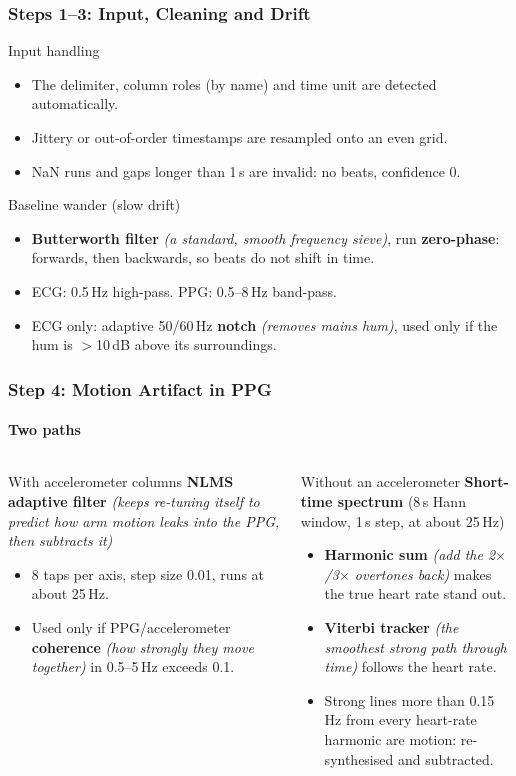 \documentclass[t,aspectratio=169]{beamer}
\newcommand*\lev{\item[\color{red}\scalebox{0.9}{\textbullet}]}
\newcommand{\plain}[1]{{\color{gray}\textit{(#1)}}}
\begin{document}
\begin{frame}
\frametitle{Steps 1--3: Input, Cleaning and Drift}
\begin{block}{Input handling}
\begin{itemize}
  \item The delimiter, column roles (by name) and time unit are detected automatically.
  \item Jittery or out-of-order timestamps are resampled onto an even grid.
  \item NaN runs and gaps longer than 1\,s are invalid: no beats, confidence 0.
\end{itemize}
\end{block}
\begin{block}{Baseline wander (slow drift)}
\begin{itemize}
  \item \textbf{Butterworth filter} \plain{a standard, smooth frequency sieve}, run \textbf{zero-phase}: forwards,
        then backwards, so beats do not shift in time.
  \item ECG: 0.5\,Hz high-pass. PPG: 0.5--8\,Hz band-pass.
  \item ECG only: adaptive 50/60\,Hz \textbf{notch} \plain{removes mains hum}, used only if the hum is
        $>$10\,dB above its surroundings.
\end{itemize}
\end{block}
\end{frame}

\begin{frame}
\frametitle{Step 4: Motion Artifact in PPG}
\framesubtitle{Two paths}
\small
\begin{columns}[T]
\begin{block}{With accelerometer columns}
\textbf{NLMS adaptive filter} \plain{keeps re-tuning itself to predict how arm motion leaks into the PPG, then
subtracts it}
\begin{itemize}
  \lev 8 taps per axis, step size 0.01, runs at about 25\,Hz.
  \lev Used only if PPG/accelerometer \textbf{coherence} \plain{how strongly they move together} in 0.5--5\,Hz
       exceeds 0.1.
\end{itemize}
\end{block}
\begin{block}{Without an accelerometer}
\textbf{Short-time spectrum} (8\,s Hann window, 1\,s step, at about 25\,Hz)
\begin{itemize}
  \lev \textbf{Harmonic sum} \plain{add the 2$\times$/3$\times$ overtones back} makes the true heart rate stand out.
  \lev \textbf{Viterbi tracker} \plain{the smoothest strong path through time} follows the heart rate.
  \lev Strong lines more than 0.15\,Hz from every heart-rate harmonic are motion: re-synthesised and subtracted.
\end{itemize}
\end{block}
\end{columns}
\end{frame}
\end{document}
